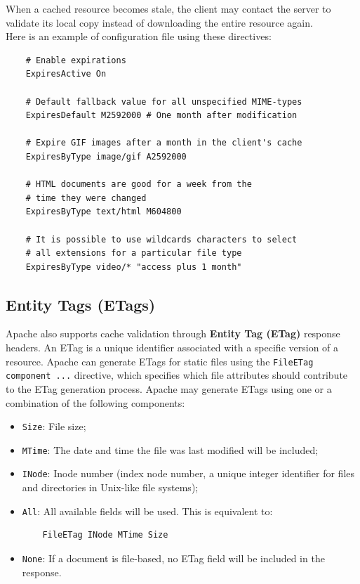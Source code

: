 \documentclass{scrbook}
\begin{document}
	When a cached resource becomes stale, the client may contact the server to validate its local copy instead of downloading the entire resource again.\\
	
	Here is an example of configuration file using these directives:
	\begin{lstlisting}
	# Enable expirations
	ExpiresActive On
	
	# Default fallback value for all unspecified MIME-types
	ExpiresDefault M2592000 # One month after modification
	
	# Expire GIF images after a month in the client's cache
	ExpiresByType image/gif A2592000
	
	# HTML documents are good for a week from the
	# time they were changed
	ExpiresByType text/html M604800
	
	# It is possible to use wildcards characters to select
	# all extensions for a particular file type
	ExpiresByType video/* "access plus 1 month"
	\end{lstlisting}
	
	\subsection{Entity Tags (ETags)}
	
	Apache also supports cache validation through \textbf{Entity Tag (ETag)} response headers. An ETag is a unique identifier associated with a specific version of a resource. Apache can generate ETags for static files using the \texttt{FileETag component ...} directive, which specifies which file attributes should contribute to the ETag generation process. Apache may generate ETags using one or a combination of the following components:
	\begin{itemize}
		\item \texttt{Size}: File size;
		\item \texttt{MTime}: The date and time the file was last modified will be included;
		\item \texttt{INode}: Inode number (index node number, a unique integer identifier for files and directories in Unix-like file systems);
		\item \texttt{All}: All available fields will be used. This is equivalent to:
		\begin{lstlisting}
	FileETag INode MTime Size
		\end{lstlisting}
		\item \texttt{None}: If a document is file-based, no ETag field will be included in the response.
	\end{itemize}
	
\end{document}
